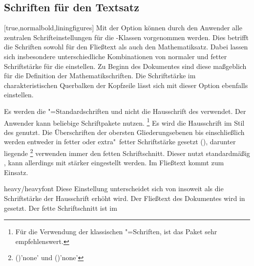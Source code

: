 \begin{Declaration*}{}
\begin{Declaration*}{}
\begin{Declaration*}{}
\subsection{Schriften für den Textsatz}
%
%
%
\begin{Declaration}[%
  v2.02!\Option{cdfont=head};
  v2.02!\Option{cdfont=heavyhead};
  v2.03!\Option{cdfont=din};
  v2.03!\Option{cdfont=nodin};
  v2.05!\Option{cdfont=normalbold};
  v2.05!\Option{cdfont=ultrabold};
  v2.06!\Option{cdfont=liningfigures};
  v2.06!\Option{cdfont=oldstylefigures};
  v2.06!\Option{cdfont=standardgreek};
]{}[true,normalbold,liningfigures]%
\printdeclarationlist%
%
Mit der Option  können durch den Anwender alle zentralen 
Schrifteinstellungen für die \TUDScript-Klassen vorgenommen werden. Dies 
betrifft die Schriften sowohl für den Fließtext als auch den Mathematiksatz.
Dabei lassen sich insbesondere unterschiedliche Kombinationen von normaler und 
fetter Schriftstärke für die \OpenSans einstellen. Zu Beginn des Dokumentes 
sind diese maßgeblich für die Definition der Mathematikschriften. Die 
Schriftstärke im charakteristischen Querbalken der Kopfzeile lässt sich mit 
dieser Option ebenfalls einstellen.
%
\begin{values}{}
\itemfalse
  Es werden die "=Standardschriften und nicht die Hausschrift 
  des \CDs verwendet. Der Anwender kann beliebige Schriftpakete nutzen.%
  \footnote{%
    Für die Verwendung der klassischen "=Schriften, ist das Paket 
     sehr empfehlenswert.%
  }
  Es wird die Hausschrift \OpenSans im Stil des \CDs genutzt. Die Überschriften 
  der obersten Gliederungsebenen bis einschließlich  
  werden entweder in fetter oder extra"~fetter Schriftstärke gesetzt 
  (), darunter liegende%
  \footnote{%
    ()'none' und 
    ()'none'%
  } verwenden immer den fetten Schriftschnitt. Dieser nutzt standardmäßig 
  , kann allerdings mit  
  stärker eingestellt werden. Im Fließtext kommt  zum 
  Einsatz.
\item[heavy/heavyfont]
  Diese Einstellung unterscheidet sich von  insoweit als 
  die Schriftstärke der Hausschrift erhöht wird. Der Fließtext des Dokumentes 
  wird in  gesetzt. Der fette Schriftschnitt ist im 

\end{values}
\end{Declaration}
\end{Declaration*}
\end{Declaration*}
\end{Declaration*}
